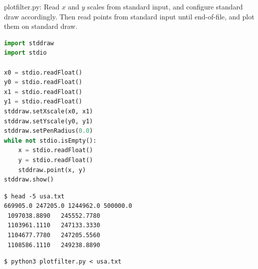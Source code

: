 \documentclass[8pt,a4paper,compress]{beamer}
\begin{document}
\begin{frame}[fragile]
\pause

\begin{framed}
\tiny plotfilter.py: Read $x$ and $y$ scales from standard input, and configure standard draw accordingly. Then read points from standard input until end-of-file, and plot them on standard draw.
\end{framed}

\begin{lstlisting}[language=Python,style=focusin]
import stddraw
import stdio

x0 = stdio.readFloat()
y0 = stdio.readFloat()
x1 = stdio.readFloat()
y1 = stdio.readFloat()
stddraw.setXscale(x0, x1)
stddraw.setYscale(y0, y1)
stddraw.setPenRadius(0.0)
while not stdio.isEmpty():
    x = stdio.readFloat()
    y = stdio.readFloat()
    stddraw.point(x, y)
stddraw.show()
\end{lstlisting}

\pause

\begin{minipage}{150pt}
\begin{lstlisting}[language={},style=focusin]
$ head -5 usa.txt 
669905.0 247205.0 1244962.0 500000.0
 1097038.8890   245552.7780
 1103961.1110   247133.3330
 1104677.7780   247205.5560
 1108586.1110   249238.8890
\end{lstlisting}

\pause

\begin{lstlisting}[language={},style=focusin]
$ python3 plotfilter.py < usa.txt
\end{lstlisting}
\end{minipage}%
\begin{minipage}{150pt}
\hfill {}
\end{minipage}
\end{frame}
\end{document}
